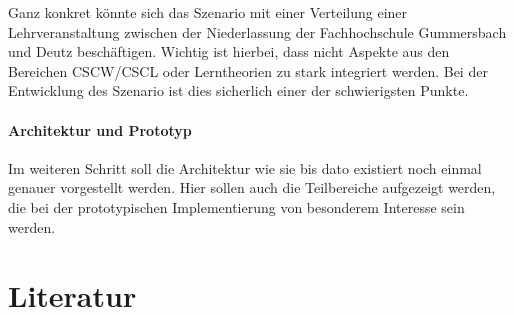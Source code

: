 \documentclass[11pt,headsepline,a4paper,bibtotoc,liststotoc,DIV12,BCOR12mm]{scrartcl}
\begin{document}
  Ganz konkret könnte sich das Szenario mit einer Verteilung einer Lehrveranstaltung zwischen der Niederlassung der Fachhochschule Gummersbach und Deutz beschäftigen. Wichtig ist hierbei, dass nicht Aspekte aus den Bereichen CSCW/CSCL oder Lerntheorien zu stark integriert werden. Bei der Entwicklung des Szenario ist dies sicherlich einer der schwierigsten Punkte.


\paragraph{Architektur und Prototyp} %
\label{par:architektur_und_prototyp}

  Im weiteren Schritt soll die Architektur wie sie bis dato existiert noch einmal genauer vorgestellt werden. Hier sollen auch die Teilbereiche aufgezeigt werden, die bei der prototypischen Implementierung von besonderem Interesse sein werden.



\section{Literatur} %
\label{sec:literatur}


% 
% 
% 

\end{document}
